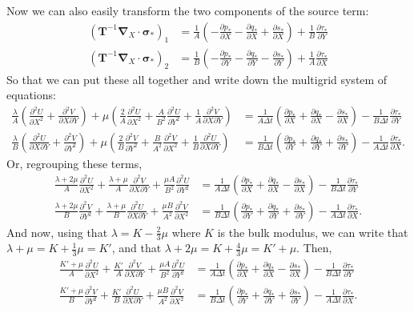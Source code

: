 \documentclass[11pt]{article}
\newcommand{\p}{\partial}
\newcommand{\bsig}{\boldsymbol\sigma}
\newcommand{\bT}{\mathbf{T}}
\begin{document}
Now we can also easily transform the two components of the source term:
\begin{align*}
    \left(\bT^{-1}\boldsymbol{\nabla}_X\cdot\bsig_*\right)_1 &= \frac{1}{A}\left(-\frac{\p p_*}{\p X} - \frac{\p q_*}{\p X} + \frac{\p s_*}{\p X}\right) + \frac{1}{B}\frac{\p \tau_*}{\p Y}\\
\left(\bT^{-1}\boldsymbol{\nabla}_X\cdot\bsig_*\right)_2 &= \frac{1}{B}\left(-\frac{\p p_*}{\p Y} - \frac{\p q_*}{\p Y} - \frac{\p s_*}{\p Y}\right)  + \frac{1}{A}\frac{\p \tau_*}{\p X}
\end{align*}
So that we can put these all together and write down the multigrid system of equations:
\begin{align*}
    \frac{\lambda}{A}\left(\frac{\p^2 U}{\p X^2} + \frac{\p^2 V}{\p X\p Y}\right) + \mu\left(\frac{2}{A}\frac{\p^2 U}{\p X^2} + \frac{A}{B^2}\frac{\p^2 U}{\p Y^2} + \frac{1}{A}\frac{\p^2 V}{\p X\p Y}\right) &= \frac{1}{A\Delta t}\left(\frac{\p p_*}{\p X} + \frac{\p q_*}{\p X} - \frac{\p s_*}{\p X}\right) - \frac{1}{B\Delta t}\frac{\p \tau_*}{\p Y}\\
    \frac{\lambda}{B}\left(\frac{\p^2 U}{\p X \p Y} + \frac{\p^2 V}{\p Y^2}\right) + \mu\left(\frac{2}{B}\frac{\p^2 V}{\p Y^2} + \frac{B}{A^2}\frac{\p^2 V}{\p X^2} + \frac{1}{B}\frac{\p^2 U}{\p X\p Y}\right) &= \frac{1}{B\Delta t}\left(\frac{\p p_*}{\p Y} + \frac{\p q_*}{\p Y} + \frac{\p s_*}{\p Y}\right) - \frac{1}{A\Delta t}\frac{\p \tau_*}{\p X}.
\end{align*}
Or, regrouping these terms,
\begin{align*}
    \frac{\lambda + 2\mu}{A}\frac{\p^2 U}{\p X^2} + \frac{\lambda + \mu}{A}\frac{\p^2 V}{\p X\p Y} + \frac{\mu A}{B^2}\frac{\p^2 U}{\p Y^2} &= \frac{1}{A\Delta t}\left(\frac{\p p_*}{\p X} + \frac{\p q_*}{\p X} - \frac{\p s_*}{\p X}\right) - \frac{1}{B\Delta t}\frac{\p \tau_*}{\p Y}\\
    \frac{\lambda + 2\mu}{B}\frac{\p^2 V}{\p Y^2} + \frac{\lambda + \mu}{B}\frac{\p^2 U}{\p X\p Y} + \frac{\mu B}{A^2}\frac{\p^2 V}{\p X^2} &= \frac{1}{B\Delta t}\left(\frac{\p p_*}{\p Y} + \frac{\p q_*}{\p Y} + \frac{\p s_*}{\p Y}\right) - \frac{1}{A\Delta t}\frac{\p \tau_*}{\p X}.
\end{align*}
And now, using that $\lambda = K - \frac{2}{3}\mu$ where $K$ is the bulk modulus, we can write that $\lambda + \mu = K + \frac{1}{3}\mu = K'$, and that $\lambda + 2\mu = K + \frac{4}{3}\mu = K' + \mu$. Then,
\begin{align*}
    \frac{K' + \mu}{A}\frac{\p^2 U}{\p X^2} + \frac{K'}{A}\frac{\p^2 V}{\p X\p Y} + \frac{\mu A}{B^2}\frac{\p^2 U}{\p Y^2} &= \frac{1}{A\Delta t}\left(\frac{\p p_*}{\p X} + \frac{\p q_*}{\p X} - \frac{\p s_*}{\p X}\right) - \frac{1}{B\Delta t}\frac{\p \tau_*}{\p Y}\\
    \frac{K' + \mu}{B}\frac{\p^2 V}{\p Y^2} + \frac{K'}{B}\frac{\p^2 U}{\p X\p Y} + \frac{\mu B}{A^2}\frac{\p^2 V}{\p X^2} &= \frac{1}{B\Delta t}\left(\frac{\p p_*}{\p Y} + \frac{\p q_*}{\p Y} + \frac{\p s_*}{\p Y}\right) - \frac{1}{A\Delta t}\frac{\p \tau_*}{\p X}.
\end{align*}
\end{document}
